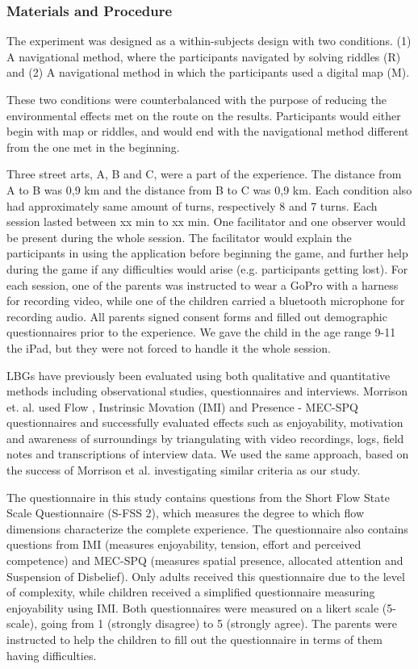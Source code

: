 \subsubsection{Materials and Procedure}
The experiment was designed as a within-subjects design with two conditions. (1) A navigational method, where the participants navigated by solving riddles (R) and (2) A navigational method in which the participants used a digital map (M).

These two conditions were counterbalanced with the purpose of reducing the environmental effects met on the route on the results. Participants would either begin with map or riddles, and would end with the navigational method different from the one met in the beginning. 

Three street arts, A, B and C, were a part of the experience. The distance from A to B was 0,9 km and the distance from B to C was 0,9 km. Each condition also had approximately same amount of turns, respectively 8 and 7 turns. Each session lasted between xx min to xx min. One facilitator and one observer would be present during the whole session. The facilitator would explain the participants in using the application before beginning the game, and further help during the game if any difficulties would arise (e.g. participants getting lost). For each session, one of the parents was instructed to wear a GoPro with a harness for recording video, while one of the children carried a bluetooth microphone for recording audio. All parents signed consent forms and filled out demographic questionnaires prior to the experience. We gave the child in the age range 9-11 the iPad, but they were not forced to handle it the whole session. 

LBGs have previously been evaluated using both qualitative and quantitative methods including observational studies, questionnaires and interviews. Morrison et. al. used Flow \cite{GameFlow} , Instrinsic Movation (IMI) \cite{whatwhy} and Presence - MEC-SPQ \cite{Presence} questionnaires and successfully evaluated effects such as enjoyability, motivation and awareness of surroundings by triangulating with video recordings, logs, field notes and transcriptions of interview data. We used the same approach, based on the success of Morrison et al. investigating similar criteria as our study. 

The questionnaire in this study contains questions from the Short Flow State Scale Questionnaire (S-FSS 2), which measures the degree to which flow dimensions characterize the
complete experience\cite{flowfss}. The questionnaire also contains questions from IMI (measures enjoyability, tension, effort and perceived competence) and MEC-SPQ (measures spatial presence, allocated attention and Suspension of Disbelief). Only adults received this questionnaire due to the level of complexity, while children received a simplified questionnaire measuring enjoyability using IMI. Both questionnaires were measured on a likert scale (5-scale), going from 1 (strongly disagree) to 5 (strongly agree). The parents were instructed to help the children to fill out the questionnaire in terms of them having difficulties. 
 
